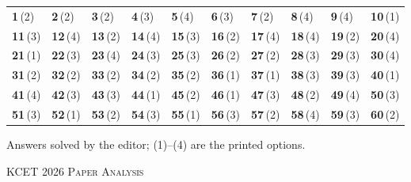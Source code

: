 {\small\setlength{\tabcolsep}{1pt}\renewcommand{\arraystretch}{1.5}
\begin{tabularx}{\linewidth}{@{}*{10}{>{\centering\arraybackslash}X}@{}}\toprule
\textbf{1}\,(2) & \textbf{2}\,(2) & \textbf{3}\,(2) & \textbf{4}\,(3) & \textbf{5}\,(4) & \textbf{6}\,(3) & \textbf{7}\,(2) & \textbf{8}\,(4) & \textbf{9}\,(4) & \textbf{10}\,(1)\\
\textbf{11}\,(3) & \textbf{12}\,(4) & \textbf{13}\,(2) & \textbf{14}\,(4) & \textbf{15}\,(3) & \textbf{16}\,(2) & \textbf{17}\,(4) & \textbf{18}\,(4) & \textbf{19}\,(2) & \textbf{20}\,(4)\\
\textbf{21}\,(1) & \textbf{22}\,(3) & \textbf{23}\,(4) & \textbf{24}\,(3) & \textbf{25}\,(3) & \textbf{26}\,(2) & \textbf{27}\,(2) & \textbf{28}\,(3) & \textbf{29}\,(3) & \textbf{30}\,(4)\\
\textbf{31}\,(2) & \textbf{32}\,(2) & \textbf{33}\,(2) & \textbf{34}\,(2) & \textbf{35}\,(2) & \textbf{36}\,(1) & \textbf{37}\,(1) & \textbf{38}\,(3) & \textbf{39}\,(3) & \textbf{40}\,(1)\\
\textbf{41}\,(4) & \textbf{42}\,(3) & \textbf{43}\,(3) & \textbf{44}\,(1) & \textbf{45}\,(2) & \textbf{46}\,(1) & \textbf{47}\,(3) & \textbf{48}\,(2) & \textbf{49}\,(4) & \textbf{50}\,(3)\\
\textbf{51}\,(3) & \textbf{52}\,(1) & \textbf{53}\,(2) & \textbf{54}\,(3) & \textbf{55}\,(1) & \textbf{56}\,(3) & \textbf{57}\,(2) & \textbf{58}\,(4) & \textbf{59}\,(3) & \textbf{60}\,(2)\\\bottomrule\end{tabularx}}\par\smallskip
{\footnotesize Answers solved by the editor; (1)--(4) are the printed options.\par
}\par
\clearpage
\begin{center}{}\par
{\fontsize{20}{24}\selectfont\color{navy}\scshape KCET 2026 \textperiodcentered{} Paper Analysis}\par
{\color{gilt}}\end{center}
\vspace{4pt}
